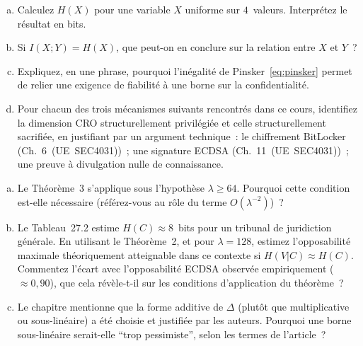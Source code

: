 \bigskip

\begin{boxexo}[title={\ding{45}\quad Exercice~27.1. Maîtrise des outils de théorie de l'information \niveaubase}]
\begin{enumerate}[(a)]
    \item Calculez $H(X)$ pour une variable $X$ uniforme sur
          $4$~valeurs. Interprétez le résultat en bits.
    \item Si $I(X;Y) = H(X)$, que peut-on en conclure sur la
          relation entre $X$ et $Y$~?
    \item Expliquez, en une phrase, pourquoi l'inégalité de
          Pinsker~\eqref{eq:pinsker} permet de relier une exigence
          de fiabilité à une borne sur la confidentialité.
    \item Pour chacun des trois mécanismes suivants rencontrés
          dans ce cours, identifiez la dimension CRO structurellement
          privilégiée et celle structurellement sacrifiée, en
          justifiant par un argument technique~: le chiffrement
          BitLocker (Ch.~6~(UE~SEC4031))~; une signature ECDSA
          (Ch.~11~(UE~SEC4031))~; une preuve à divulgation
          nulle de connaissance.
\end{enumerate}
\end{boxexo}

\begin{boxexo}[title={\ding{45}\quad Exercice~27.2. Lecture critique du Théorème~3 \niveaumoyen}]
\begin{enumerate}[(a)]
    \item Le Théorème~3 s'applique sous l'hypothèse
          $\lambda \geq 64$. Pourquoi cette condition est-elle
          nécessaire (référez-vous au rôle du terme
          $O(\lambda^{-2})$)~?
    \item Le Tableau~27.2 estime $H(C) \approx 8$~bits pour un
          tribunal de juridiction générale. En utilisant le
          Théorème~2, et pour $\lambda = 128$, estimez l'opposabilité
          maximale théoriquement atteignable dans ce contexte si
          $H(V|C) \approx H(C)$. Commentez l'écart avec
          l'opposabilité ECDSA observée empiriquement
          ($\approx 0{,}90$), que cela révèle-t-il sur les
          conditions d'application du théorème~?
    \item Le chapitre mentionne que la forme additive de $\Delta$
          (plutôt que multiplicative ou sous-linéaire) a été
          choisie et justifiée par les auteurs. Pourquoi une
          borne sous-linéaire serait-elle ``trop pessimiste'',
          selon les termes de l'article~?
\end{enumerate}
\end{boxexo}

